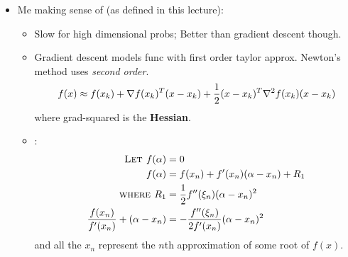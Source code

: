 \documentclass[12pt]{article}
\begin{document}
\begin{itemize}
	\item Me making sense of  (as defined in this lecture):
	\begin{itemize}
		\item Slow for high dimensional probs; Better than gradient descent though. 
		\item Gradient descent models func with first order taylor approx. Newton's method uses \textit{second order}. 
		\begin{align}
			f(x) \approx f(x_k) + \nabla f(x_k)^T(x-x_k) +
			 \frac{1}{2} (x - x_k)^T \nabla^2 f(x_k) (x - x_k)
		\end{align}
		where grad-squared is the \textbf{Hessian}. 
		\item {}:
		\begin{align}
			\textsc{Let } f(\alpha) &= 0 \\
			f(\alpha) &= f(x_n) + f'(x_n)(\alpha - x_n) + R_1 \\
			\textsc{where } R_1 &= \frac{1}{2} f''(\xi_n) (\alpha - x_n)^2 \\
			\frac{f(x_n)}{f'(x_n)} + (\alpha - x_n) &= -\frac{f''(\xi_n)}{2 f'(x_n)}(\alpha - x_n)^2 \\
		\end{align}
		and all the $x_n$ represent the $n$th approximation of some root of $f(x)$. 
	\end{itemize}
	

\end{itemize}
\end{document}
